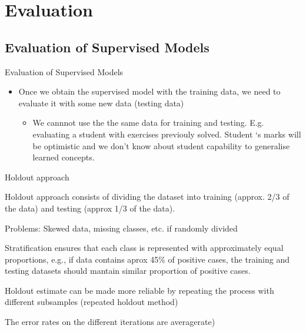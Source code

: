 \documentclass{beamer}
\begin{document}
\section{Evaluation}


\subsection{Evaluation of Supervised Models}

\begin{frame}{Evaluation of Supervised Models}

\begin{itemize}
 \item Once we obtain the supervised model with the training data, we need to evaluate it with some new data (testing data)
 
 \begin{itemize}
  \item We cannnot use the the same data for training and testing. E.g. evaluating a student with exercises previouly solved. Student ‘s marks will be optimistic and we don’t know about student capability to generalise learned concepts.
 \end{itemize}

\end{itemize}


\end{frame}


\begin{frame}{Holdout approach}


\alert{Holdout approach} consists of dividing the dataset into training (approx. 2/3 of the data) and testing (approx 1/3 of the data).

Problems: Skewed data, missing classes, etc. if randomly divided

\alert{Stratification} ensures that each class is represented with approximately equal proportions, e.g., if data contains aprox 45\% of positive cases, the training and testing datasets should mantain similar proportion of positive cases. 

Holdout estimate can be made more reliable by repeating the process with different subsamples (\alert{repeated holdout method})

The error rates on the different iterations are averagerate)
\end{frame}
\end{document}
